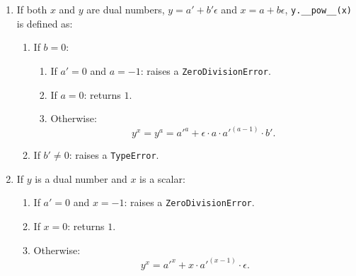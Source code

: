 \documentclass[a4paper,12pt]{article}
\begin{document}
\begin{itemize}
\begin{enumerate}
\begin{enumerate}
    \item If both \(x\) and \(y\) are dual numbers, \(y = a' + b'\epsilon\) and \(x = a + b\epsilon\), \texttt{y.\_\_pow\_\_(x)} is defined as:
    \begin{enumerate}
        \item If \(b = 0\):
        \begin{enumerate}
            \item If \(a' = 0\) and \(a = -1\): raises a \texttt{ZeroDivisionError}.
            \item If \(a = 0\): returns \(1\).
            \item Otherwise: 
            \[
            y^x = y^a = a'^{a} + \epsilon \cdot a \cdot a'^{(a-1)} \cdot b'.
            \]
        \end{enumerate}
        
        \item If \(b' \neq 0\): raises a \texttt{TypeError}.
    \end{enumerate}
    
    \item If \(y\) is a dual number and \(x\) is a scalar:
    \begin{enumerate}
        \item If \(a' = 0\) and \(x = -1\): raises a \texttt{ZeroDivisionError}.
        \item If \(x = 0\): returns \(1\).
        \item Otherwise:
        \[
        y^x = a'^x + x \cdot a'^{(x-1)} \cdot \epsilon.
        \]
    \end{enumerate}
\end{enumerate}


\end{enumerate}
\end{itemize}
\end{document}

